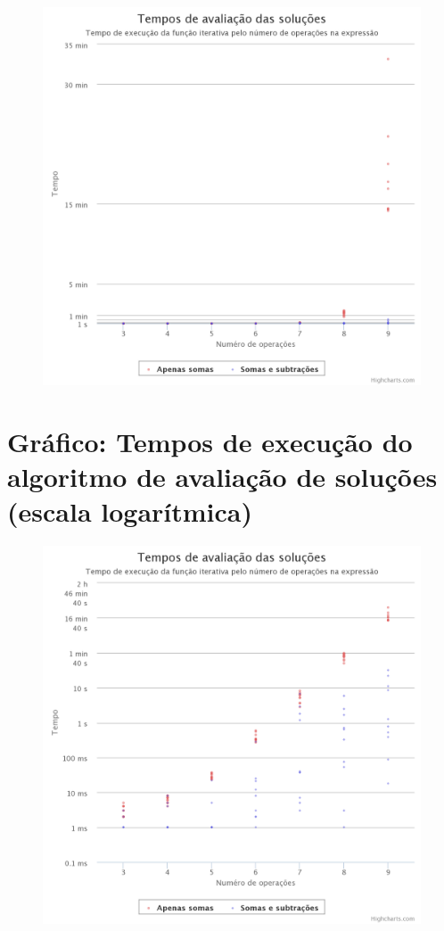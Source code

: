 \begin{anexosenv}
\begin{figure}[H]
	\begin{center}
	    \includegraphics[scale=0.75]{timming_test_lin.png}
	\end{center}
\end{figure}

\chapter{Gráfico: Tempos de execução do algoritmo de avaliação de soluções (escala logarítmica)}

\begin{figure}[H]
	\begin{center}
	    \includegraphics[scale=0.75]{timming_test_log.png}
	\end{center}
\end{figure}

\end{anexosenv}
